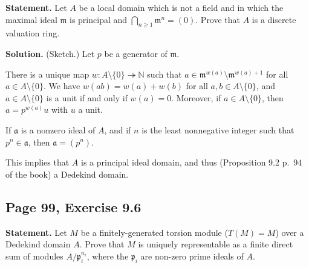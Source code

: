 \documentclass[parskip=half,fontsize=12pt]{scrartcl}%
\newcommand{\mf}{\mathfrak}
\newcommand{\aaa}{\mf a}
\newcommand{\mmm}{\mf m}
\newcommand{\ppp}{\mf p}
\newcommand{\epi}{\twoheadrightarrow}
\begin{document}
\textbf{Statement.} Let $A$ be a local domain which is not a field and in which the maximal ideal $\mmm$ is principal and $\bigcap_{n\ge1}\mmm^n=(0)$. Prove that $A$ is a discrete valuation ring.

\textbf{Solution.} (Sketch.) Let $p$ be a generator of $\mmm$. 

There is a unique map $w:A\setminus\{0\}\epi\mathbb N$ such that $a\in\mmm^{w(a)}\setminus\mmm^{w(a)+1}$ for all $a\in A\setminus\{0\}$. We have $w(ab)=w(a)+w(b)$ for all $a,b\in A\setminus\{0\}$, and $a\in A\setminus\{0\}$ is a unit if and only if $w(a)=0$. Moreover, if $a\in A\setminus\{0\}$, then $a=p^{w(a)}u$ with  $u$ a unit.

If $\aaa$ is a nonzero ideal of $A$, and if $n$ is the least nonnegative integer such that $p^n\in\aaa$, %
then $\aaa=(p^n)$. 

This implies that $A$ is a principal ideal domain, and thus (Proposition 9.2 p.~94 of the book) a Dedekind domain.





\subsection{Page 99, Exercise 9.6}%

\textbf{Statement.} Let $M$ be a finitely-generated torsion module ($T(M)=M$) over a Dedekind domain $A$. Prove that $M$ is uniquely representable as a finite direct sum of modules $A/\ppp_i^{n_i}$, where the $\ppp_i$ are non-zero prime ideals of $A$.
\end{document}
